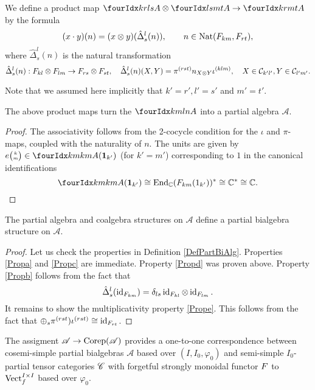 
\begin{Def} We define a product map $\Gr{A}{k}{l}{r}{s} \otimes \Gr{A}{l}{m}{s}{t}\rightarrow  \Gr{A}{k}{m}{r}{t}$ by the formula \[(x\cdot y)(n) = (x\otimes y)( \hat{\Delta}^{l}_{s}(n)), \qquad  n \in \operatorname{\mathrm{Nat}}(F_{km},F_{rt}),\] where $\hat{\Delta}^l_s(n)$ is the natural transformation\[\hat{\Delta}^l_s(n):  F_{kl}\otimes F_{lm}\rightarrow F_{rs}\otimes F_{st},\quad \hat{\Delta}^l_s(n)(X,Y) = \pi^{(rst)}n_{X\otimes Y} \iota^{(klm)},\quad X\in \mathcal{C}_{k'l'},Y\in \mathcal{C}_{l'm'}.\]
\end{Def}

Note that we assumed here implicitly that $k'=r', l'=s'$ and $m'=t'$.

\begin{Lem} The above product maps turn the $\Gr{A}{k}{l}{m}{n}$ into a partial algebra $\mathscr{A}$.
\end{Lem}
\begin{proof} The associativity follows from the 2-cocycle condition for the $\iota$ and $\pi$-maps, coupled with the naturality of $n$. The units are given by $\un{k}{m}\in \Gr{A}{k}{k}{m}{m}(\Unit_{k'})$  (for $k'=m'$) corresponding to $1$ in the canonical identifications  \[\Gr{A}{k}{k}{m}{m}(\Unit_{k'}) \cong \End_{\C}(\Forget_{km}(1_{k'}))^* \cong \C^* \cong \C.\]
\end{proof} 

\begin{Prop} The partial algebra and coalgebra structures on $\mathscr{A}$ define a partial bialgebra structure on $\mathscr{A}$. 
\end{Prop}
\begin{proof} Let us check the properties in Definition \ref{DefPartBiAlg}. Properties \ref{Propa} and \ref{Propc} are immediate. Property \ref{Propd} was proven above. Property \ref{Propb} follows from the fact that \[\hat{\Delta}^{l}_s(\operatorname{id}_{F_{km}}) = \delta_{ls} \operatorname{id}_{F_{kl}}\otimes \operatorname{id}_{F_{lm}}.\] %
It remains to show the multiplicativity property \ref{Prope}. This follows from the fact that $\oplus_s \pi^{(rst})\iota^{(rst)} \cong \operatorname{id}_{F_{rt}}$. 
\end{proof} 

\begin{Theorem}\label{TheoTKBialg} The assigment $\mathscr{A}\rightarrow \mathrm{Corep}(\mathscr{A})$ provides a one-to-one correspondence between cosemi-simple partial bialgebras $\mathscr{A}$ based over $(I,I_0,\varphi_0)$ %
and semi-simple $I_0$-partial tensor categories $\mathscr{C}$ with forgetful strongly monoidal functor $F$ to $\mathrm{Vect}_f^{I\times I}$ based over $\varphi_0$. %
\end{Theorem}

